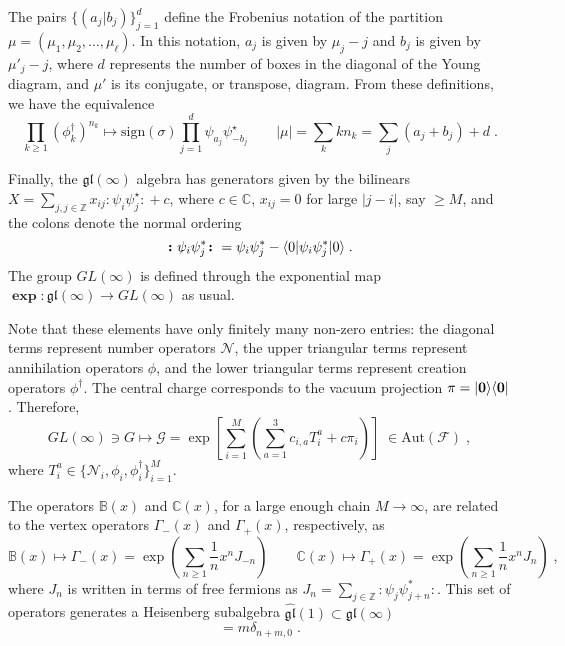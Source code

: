 \documentclass[a4paper,11pt]{amsart}
\begin{document}
The pairs \(\{(a_j|b_j)\}_{j=1}^d\) define the Frobenius notation of
the partition \(\mu = (\mu_1, \mu_2, \dots, \mu_\ell)\). In this
notation, \(a_j\) is given by \(\mu_j - j\) and \(b_j\) is given by
\(\mu'_j - j\), where \(d\) represents the number of boxes in the
diagonal of the Young diagram, and \(\mu'\) is its conjugate, or
transpose, diagram. From these definitions, we have the equivalence
\begin{equation}
  \prod_{k\geq 1} (\phi_k^\dagger)^{n_k} \mapsto \textrm{sign}(\sigma) \prod_{j=1}^d
  \psi_{a_j} \psi^\star_{-b_j} \qquad |\mu| = \sum_k k n_k = \sum_j(a_j + b_j) + d\; .
\end{equation}

Finally, the \(\mathfrak{gl}(\infty)\) algebra has generators given by the
bilinears \(X = \sum_{j, j \in \mathbb{Z}} x_{ij} \bm{\colon} \psi_i \psi_j^\star\bm{\colon}
+ c\), where \(c\in \mathbb{C}\), \(x_{ij} =
0\) for large \(|j -i|\), say \(\geq M\), and the colons denote the normal ordering
\begin{equation}
  \bm{\colon} \psi_i \psi_j^\ast \bm{\colon} =  \psi_i \psi_j^\ast
  - \langle0\rvert \psi_i \psi_j^\ast \lvert0\rangle \; .
\end{equation}
The group \(GL(\infty)\) is defined through the exponential map
\(\bm{\exp}: \mathfrak{gl}(\infty) \to GL(\infty)\) as usual.

Note that these elements have only finitely many non-zero entries: the
diagonal terms represent number operators \(\mathcal{N}\), the upper
triangular terms represent annihilation operators \(\phi\), and the
lower triangular terms represent creation operators
\(\phi^\dagger\). The central charge corresponds to the vacuum
projection \(\pi = \lvert\bm{0}\rangle\langle\bm{0}\rvert\).  Therefore,
\begin{equation}
   GL(\infty) \ni G \mapsto
   \mathcal{G} = \exp \left[\sum_{i=1}^M \left( \sum_{a=1}^3
   c_{i, a} T_i^{a}  + c \pi_i \right)\right] \; \in  \mathrm{Aut}(\mathcal{F})\; ,
\end{equation}
where \(T^{a}_i \in \{ \mathcal{N}_i, \phi_i, \phi_i^\dagger \}_{i=1}^M\). 

The operators \(\mathbb{B}(x)\) and \(\mathbb{C}(x)\), 
for a large enough chain \(M\to \infty\),
are related to the vertex operators
\(\Gamma_-(x)\) and \(\Gamma_+(x)\), respectively, as
\begin{equation}
    \mathbb{B}(x) \mapsto \Gamma_-(x)  = \exp \left( \sum_{n\geq 1} \frac{1}{n}x^n J_{-n}\right) \qquad 
    \mathbb{C}(x) \mapsto \Gamma_+(x)  = \exp \left( \sum_{n\geq 1} \frac{1}{n}x^n J_{n}\right) \; ,
\end{equation}
where \(J_n \) is written in terms of free fermions as \(J_n =
\sum_{j\in \mathbb{Z}} \bm{\colon} \psi_j \psi_{j+n}^\ast
\bm{\colon}\). This set of operators generates a Heisenberg subalgebra
\(\widehat{\mathfrak{gl}}(1) \subset \mathfrak{gl}(\infty)\)
\begin{equation}
  [J_m, J_n] = m \delta_{n+m,0}\; .
\end{equation}
\end{document}

